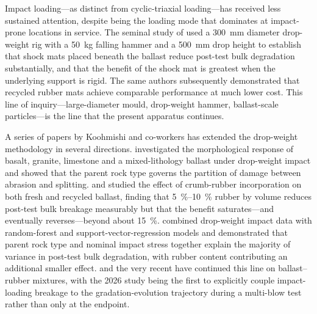 Impact loading---as distinct from cyclic-triaxial loading---has received
less sustained attention, despite being the loading mode that dominates
at impact-prone locations in service. The seminal study of
\citet{Nimbalkar2012} used a \SI{300}{\milli\metre} diameter drop-weight
rig with a \SI{50}{\kilogram} falling hammer and a \SI{500}{\milli\metre}
drop height to establish that shock mats placed beneath the ballast
reduce post-test bulk degradation substantially, and that the benefit of
the shock mat is greatest when the underlying support is rigid. The same
authors subsequently demonstrated that recycled rubber mats achieve
comparable performance at much lower cost. This line of
inquiry---large-diameter mould, drop-weight hammer, ballast-scale
particles---is the line that the present apparatus continues.

A series of papers by Koohmishi and co-workers has extended the
drop-weight methodology in several directions. \citet{Koohmishi2020}
investigated the morphological response of basalt, granite, limestone and
a mixed-lithology ballast under drop-weight impact and showed that the
parent rock type governs the partition of damage between abrasion and
splitting. \citet{Koohmishi2021} and \citet{Koohmishi2022} studied the
effect of crumb-rubber incorporation on both fresh and recycled ballast,
finding that \SIrange{5}{10}{\percent} rubber by volume reduces post-test
bulk breakage measurably but that the benefit saturates---and eventually
reverses---beyond about \SI{15}{\percent}. \citet{Koohmishi2023} combined
drop-weight impact data with random-forest and support-vector-regression
models and demonstrated that parent rock type and nominal impact stress
together explain the majority of variance in post-test bulk degradation,
with rubber content contributing an additional smaller effect.
\citet{Zhang2023} and the very recent \citet{Chen2026} have continued
this line on ballast--rubber mixtures, with the 2026 study being the
first to explicitly couple impact-loading breakage to the
gradation-evolution trajectory during a multi-blow test rather than only
at the endpoint.

